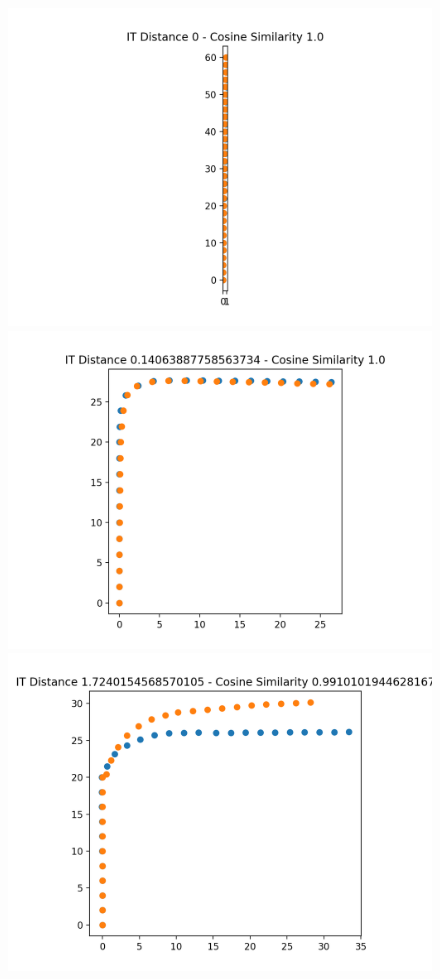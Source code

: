 \documentclass[conference]{IEEEtran}
\begin{document}
\begin{figure}[t]
\includegraphics[width=\linewidth]{images/distance_cubetown_2}
\endminipage\hfill
{}
\includegraphics[width=\linewidth]{images/distance_cubetown_1}
\endminipage\hfill
{}%
  \includegraphics[width=\linewidth]{images/distance_ba_2}

\end{figure}
\end{document}
